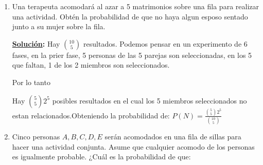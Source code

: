 \documentclass[11pt,letterpaper]{report}
\newcommand{\sol}{\textbf{\underline{Solución}: }} %
\begin{document}
\begin{enumerate}
\sol Sean los eventos:
\begin{align*}
    &A := \{ \text{17 alumnos sacaron 10 en el primer parcial}\}\\
    &B := \{ \text{14 alumnos sacaron 10 en el segundo parcial}\}\\
    &C := \{ \text{11 alumnos no obtuvieron 10 en el primer ni segundo parcial}\}
\end{align*}
Usando el principio de inclusión-exclusión para dos eventos que es:
$$P(A \cup B) = P(A) + P(B) - P(A \cup B)$$
El evento $C$ lo podemos ver como $(A \cup B)^c$ y posteriormente se ocupará las Leyes de Morgan. 
Lo que queda por hacer ahora es obtener la probabilidad de cada uno y sustituir.
\begin{align*}
    &P(A) = \frac{17}{36} \approx 0.4722\\
    &P(B) = \frac{14}{36} \approx 0.3888\\
    &P(C) = P((A \cap B)^c) = P(A^c \cup B^c) = \frac{11}{36} \approx 0.3055
\end{align*}
Susituyendo queda como:
\begin{align*}
    P(A \cup B) 
        &= P(A) + P(B) - P(A \cap B)\\
        &= P(A) + P(B) - (1 - P((A \cap B)^c))\\
        &= P(A) + P(B) - (1 - P(A^c \cup B^c))\\
        &= 0.4722 + 0.3888 - (1 - 0.3055)\\
        &\approx 0.1664
\end{align*}
Ergo la probabilidad de que un estudiante seleccionado al azar de esta clase haya sacado 10's en
ambos exámenes es $\approx$ 0.1664.

\item Una terapeuta acomodará al azar a 5 matrimonios sobre una fila para realizar una actividad.
Obtén la probabilidad de que no haya algun esposo sentado junto a su mujer sobre la fila.

\sol Hay $\binom{10}{5}$ resultados. Podemos pensar en un experimento de 6 fases, en la prier fase, 5 personas de las 5 parejas son seleccionadas, en los 5 que faltan, 1 de los 2 miembros son seleccionados.

Por lo tanto

Hay $\binom{5}{5}2^5$ posibles resultados en el cual los 5 miembros seleccionados no estan relacionados.Obteniendo la probabilidad de:
$P(N) = \frac{\binom{5}{5}{2^5}} {\binom{10}{5}}$


\item Cinco personas $A,B,C,D,E$ serán acomodados en una fila de sillas para hacer una actividad 
conjunta. Asume que cualquier acomodo de los personas es igualmente probable. ¿Cuál es la
probabilidad de que:


\end{enumerate}
\end{document}
